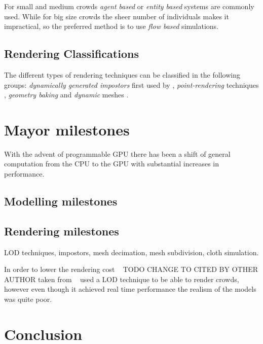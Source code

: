 \documentclass[conference]{acmsiggraph}
\begin{document}
For small and medium crowds \textit{agent based} or \textit{entity based} systems are commonly used.
While for big size crowds the sheer number of individuals makes it impractical, so the preferred method is to use \textit{flow based} simulations.

\subsection{Rendering Classifications}

The different types of rendering techniques can be classified in the following groups: \textit{dynamically generated impostors} first used by  \cite{Aubel2000}, \textit{point-rendering} techniques \cite{Wand2002}, \textit{geometry baking} \cite{Ulicny2004} and \textit{dynamic} meshes \cite{Ciechomski2005}.

%

\section{Mayor milestones}

With the advent of programmable GPU there has been a shift of general computation from the CPU to the GPU with substantial increases in performance.

\subsection{Modelling milestones}

\subsection{Rendering milestones}

LOD techniques, impostors, mesh decimation, mesh subdivision, cloth simulation.

In order to lower the rendering cost ~\cite{pratt1997humans} TODO CHANGE TO CITED BY OTHER AUTHOR taken from ~\cite{Aubel1999} used a LOD technique to be able to render crowds, however even though it  achieved real time performance the realism of the models was quite poor.



\section{Conclusion}



\end{document}
